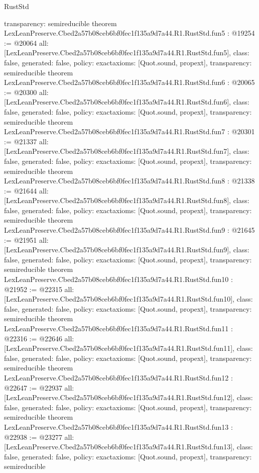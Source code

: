 \begin{lexlean}{RustStd}
\begin{coremodule}
{  transparency: semireducible
}
theorem LexLeanPreserve.Cbed2a57b08ceb6bf0fec1f135a9d7a44.R1.RustStd.fun5 : @19254 := @20064 {
  all: [LexLeanPreserve.Cbed2a57b08ceb6bf0fec1f135a9d7a44.R1.RustStd.fun5],
  class: false,
  generated: false,
  policy: exact{axioms: [Quot.sound, propext]},
  transparency: semireducible
}
theorem LexLeanPreserve.Cbed2a57b08ceb6bf0fec1f135a9d7a44.R1.RustStd.fun6 : @20065 := @20300 {
  all: [LexLeanPreserve.Cbed2a57b08ceb6bf0fec1f135a9d7a44.R1.RustStd.fun6],
  class: false,
  generated: false,
  policy: exact{axioms: [Quot.sound, propext]},
  transparency: semireducible
}
theorem LexLeanPreserve.Cbed2a57b08ceb6bf0fec1f135a9d7a44.R1.RustStd.fun7 : @20301 := @21337 {
  all: [LexLeanPreserve.Cbed2a57b08ceb6bf0fec1f135a9d7a44.R1.RustStd.fun7],
  class: false,
  generated: false,
  policy: exact{axioms: [Quot.sound, propext]},
  transparency: semireducible
}
theorem LexLeanPreserve.Cbed2a57b08ceb6bf0fec1f135a9d7a44.R1.RustStd.fun8 : @21338 := @21644 {
  all: [LexLeanPreserve.Cbed2a57b08ceb6bf0fec1f135a9d7a44.R1.RustStd.fun8],
  class: false,
  generated: false,
  policy: exact{axioms: [Quot.sound, propext]},
  transparency: semireducible
}
theorem LexLeanPreserve.Cbed2a57b08ceb6bf0fec1f135a9d7a44.R1.RustStd.fun9 : @21645 := @21951 {
  all: [LexLeanPreserve.Cbed2a57b08ceb6bf0fec1f135a9d7a44.R1.RustStd.fun9],
  class: false,
  generated: false,
  policy: exact{axioms: [Quot.sound, propext]},
  transparency: semireducible
}
theorem LexLeanPreserve.Cbed2a57b08ceb6bf0fec1f135a9d7a44.R1.RustStd.fun10 : @21952 := @22315 {
  all: [LexLeanPreserve.Cbed2a57b08ceb6bf0fec1f135a9d7a44.R1.RustStd.fun10],
  class: false,
  generated: false,
  policy: exact{axioms: [Quot.sound, propext]},
  transparency: semireducible
}
theorem LexLeanPreserve.Cbed2a57b08ceb6bf0fec1f135a9d7a44.R1.RustStd.fun11 : @22316 := @22646 {
  all: [LexLeanPreserve.Cbed2a57b08ceb6bf0fec1f135a9d7a44.R1.RustStd.fun11],
  class: false,
  generated: false,
  policy: exact{axioms: [Quot.sound, propext]},
  transparency: semireducible
}
theorem LexLeanPreserve.Cbed2a57b08ceb6bf0fec1f135a9d7a44.R1.RustStd.fun12 : @22647 := @22937 {
  all: [LexLeanPreserve.Cbed2a57b08ceb6bf0fec1f135a9d7a44.R1.RustStd.fun12],
  class: false,
  generated: false,
  policy: exact{axioms: [Quot.sound, propext]},
  transparency: semireducible
}
theorem LexLeanPreserve.Cbed2a57b08ceb6bf0fec1f135a9d7a44.R1.RustStd.fun13 : @22938 := @23277 {
  all: [LexLeanPreserve.Cbed2a57b08ceb6bf0fec1f135a9d7a44.R1.RustStd.fun13],
  class: false,
  generated: false,
  policy: exact{axioms: [Quot.sound, propext]},
  transparency: semireducible
}
\end{coremodule}
\end{lexlean}
